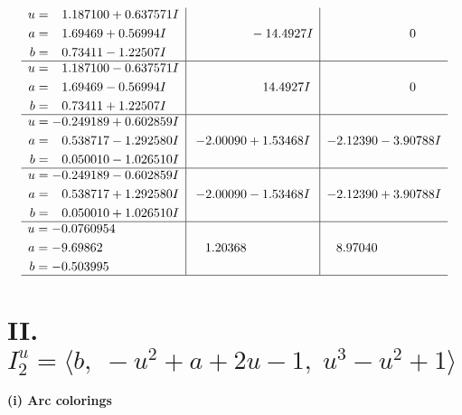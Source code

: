 \documentclass[1p]{elsarticle_modified}
\theoremstyle{definition}
\begin{document}
$$\begin{array}{c|c|c}
\begin{aligned}
u &= \phantom{-}1.187100 + 0.637571 I \\
a &= \phantom{-}1.69469 + 0.56994 I \\
b &= \phantom{-}0.73411 - 1.22507 I\end{aligned}
 & \phantom{-0.000000 } -14.4927 I & \phantom{-0.000000 } 0 \\ \hline\begin{aligned}
u &= \phantom{-}1.187100 - 0.637571 I \\
a &= \phantom{-}1.69469 - 0.56994 I \\
b &= \phantom{-}0.73411 + 1.22507 I\end{aligned}
 & \phantom{-0.000000 -}14.4927 I & \phantom{-0.000000 } 0 \\ \hline\begin{aligned}
u &= -0.249189 + 0.602859 I \\
a &= \phantom{-}0.538717 - 1.292580 I \\
b &= \phantom{-}0.050010 - 1.026510 I\end{aligned}
 & -2.00090 + 1.53468 I & -2.12390 - 3.90788 I \\ \hline\begin{aligned}
u &= -0.249189 - 0.602859 I \\
a &= \phantom{-}0.538717 + 1.292580 I \\
b &= \phantom{-}0.050010 + 1.026510 I\end{aligned}
 & -2.00090 - 1.53468 I & -2.12390 + 3.90788 I \\ \hline\begin{aligned}
u &= -0.0760954\phantom{ +0.000000I} \\
a &= -9.69862\phantom{ +0.000000I} \\
b &= -0.503995\phantom{ +0.000000I}\end{aligned}
 & \phantom{-}1.20368\phantom{ +0.000000I} & \phantom{-}8.97040\phantom{ +0.000000I}\\
 \hline 
 \end{array}$$\newpage\newpage\renewcommand{\arraystretch}{1}
\centering \section*{II. $I^u_{2}= \langle b,\;- u^2+a+2 u-1,\;u^3- u^2+1 \rangle$}
\flushleft \textbf{(i) Arc colorings}\\
\end{document}
